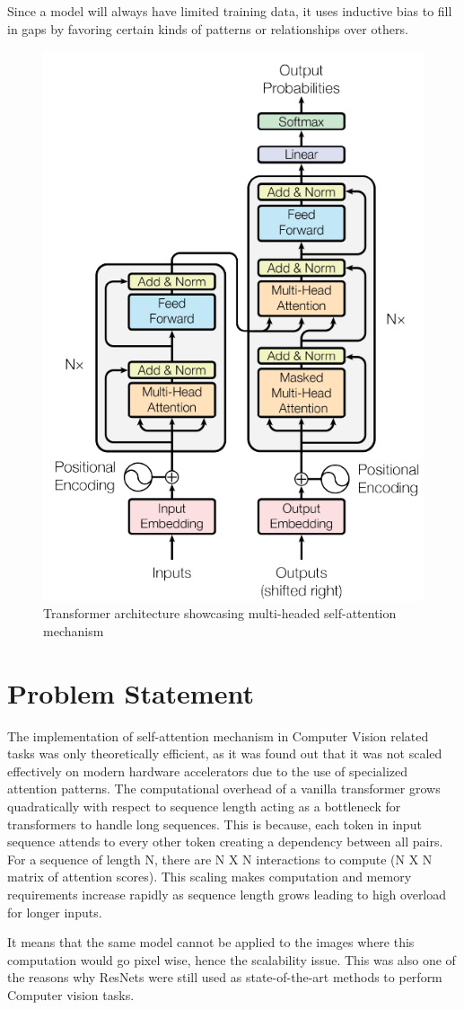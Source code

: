 \documentclass[conference]{IEEEtran}
\begin{document}
Since a model will always have limited training data, it uses inductive bias to fill in gaps by favoring certain kinds of patterns or relationships over others.


\begin{figure}[htbp]
\centerline{\includegraphics[width=0.5\linewidth]{transformer_architecture_MHSA.png}}
\caption{Transformer architecture showcasing multi-headed self-attention mechanism}

\end{figure}

\section{Problem Statement}
The implementation of self-attention mechanism in Computer Vision related tasks was only theoretically efficient, as it was found out that it was not scaled effectively on modern hardware accelerators due to the use of specialized attention patterns. The computational overhead of a vanilla transformer grows quadratically with respect to sequence length acting as a bottleneck for transformers to handle long sequences. This is because, each token in input sequence attends to every other token creating a dependency between all pairs. For a sequence of length N, there are N X N interactions to compute (N X N matrix of attention scores). This scaling makes computation and memory requirements increase rapidly as sequence length grows leading to high overload for longer inputs.

It means that the same model cannot be applied to the images where this computation would go pixel wise, hence the scalability issue. This was also one of the reasons why ResNets were still used as state-of-the-art methods to perform Computer vision tasks.
\end{document}
